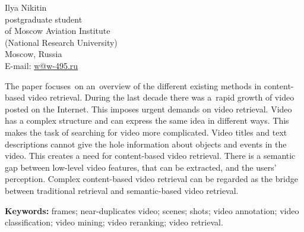 

\begin{flushright}
\sf\small
Ilya Nikitin \\
postgraduate student \\
of Moscow Aviation Institute \\
(National Research University) \\
Moscow, Russia \\
E-mail: \href{mailto: w@w-495.ru}{w@w-495.ru} \\
\end{flushright}





The paper focuses~on an~overview of the different existing methods
in content-based video retrieval.
During the last decade there was a~rapid growth
of video posted on the Internet.
This imposes urgent demands on video retrieval.
Video has a complex structure and can express the same idea
in different ways. This makes the task of searching for video more complicated.
Video titles and text descriptions cannot give the hole information
about objects and events in the video.
This creates a need for content-based video retrieval.
There is a semantic gap between low-level video features,
that can be extracted, and the users' perception.
Complex content-based video retrieval
can be regarded as the bridge between traditional retrieval
and semantic-based video retrieval.


{\bf Keywords:}
frames;
near-duplicates video;
scenes;
shots;
video annotation;
video classification;
video mining;
video reranking;
video retrieval.



